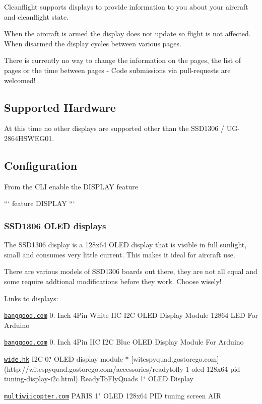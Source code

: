 Cleanflight supports displays to provide information to you about your aircraft and cleanflight state.

When the aircraft is armed the display does not update so flight is not affected. When disarmed the display cycles between various pages.

There is currently no way to change the information on the pages, the list of pages or the time between pages -\/ Code submissions via pull-\/requests are welcomed!

\subsection*{Supported Hardware}

At this time no other displays are supported other than the S\+S\+D1306 / U\+G-\/2864\+H\+S\+W\+E\+G01.

\subsection*{Configuration}

From the C\+L\+I enable the {\ttfamily D\+I\+S\+P\+L\+A\+Y} feature

``` feature D\+I\+S\+P\+L\+A\+Y ```

\subsubsection*{S\+S\+D1306 O\+L\+E\+D displays}

The S\+S\+D1306 display is a 128x64 O\+L\+E\+D display that is visible in full sunlight, small and consumes very little current. This makes it ideal for aircraft use.

There are various models of S\+S\+D1306 boards out there, they are not all equal and some require addtional modifications before they work. Choose wisely!

Links to displays\+:


\begin{DoxyItemize}
\item \href{http://www.banggood.com/0_96-Inch-4Pin-White-IIC-I2C-OLED-Display-Module-12864-LED-For-Arduino-p-958196.html}{\tt banggood.\+com} 0. Inch 4\+Pin White I\+I\+C I2\+C O\+L\+E\+D Display Module 12864 L\+E\+D For Arduino
\item \href{http://www.banggood.com/0_96-Inch-4Pin-IIC-I2C-Blue-OLED-Display-Module-For-Arduino-p-969147.html}{\tt banggood.\+com} 0. Inch 4\+Pin I\+I\+C I2\+C Blue O\+L\+E\+D Display Module For Arduino
\item \href{http://www.wide.hk/products.php?product=I2C-0.96%22-OLED-display-module-%28-compatible-Arduino-%29}{\tt wide.\+hk} I2\+C 0.\+96\char`\"{} O\+L\+E\+D display module
 $\ast$ \mbox{[}witespyquad.\+gostorego.\+com\mbox{]}(http\+://witespyquad.\+gostorego.\+com/accessories/readytofly-\/1-\/oled-\/128x64-\/pid-\/tuning-\/display-\/i2c.\+html) Ready\+To\+Fly\+Quads 1\char`\"{} O\+L\+E\+D Display
\item \href{http://www.multiwiicopter.com/products/1-oled}{\tt multiwiicopter.\+com} P\+A\+R\+I\+S 1" O\+L\+E\+D 128x64 P\+I\+D tuning screen A\+I\+R
\end{DoxyItemize}

